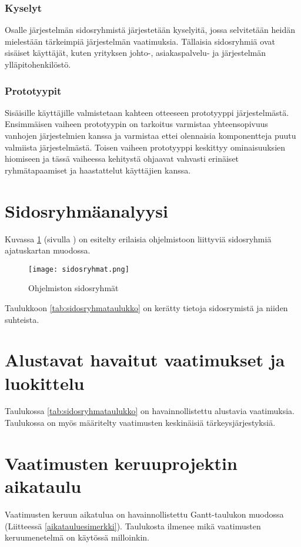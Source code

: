         \subsubsection{Kyselyt}

        Osalle järjestelmän sidosryhmistä järjestetään kyselyitä, jossa selvitetään heidän mielestään tärkeimpiä järjestelmän vaatimuksia.
        Tällaisia sidosryhmiä ovat sisäiset käyttäjät, kuten yrityksen johto-, asiakaspalvelu- ja järjestelmän ylläpitohenkilöstö.

        \subsubsection*{Prototyypit}

        Sisäisille käyttäjille valmistetaan kahteen otteeseen prototyyppi järjestelmästä. Ensimmäisen vaiheen prototyypin on tarkoitus varmistaa yhteensopivuus vanhojen järjestelmien kanssa ja varmistaa ettei olennaisia komponentteja puutu valmiista järjestelmästä. Toisen vaiheen prototyyppi keskittyy ominaisuuksien hiomiseen ja tässä vaiheessa kehitystä ohjaavat vahvasti erinäiset ryhmätapaamiset ja haastattelut käyttäjien kanssa.
	
\section{Sidosryhmäanalyysi}

        Kuvassa \ref{img:sidosryhmat} (sivulla \pageref{img:sidosryhmat}) on esitelty erilaisia ohjelmistoon liittyviä sidosryhmiä ajatuskartan muodossa.

        \begin{figure}[H] %
		\centering
		\texttt{[image: sidosryhmat.png]}
		\caption{Ohjelmiston sidosryhmät} %
		\label{img:sidosryhmat}
	\end{figure}

	Taulukkoon \ref{tab:sidosryhmataulukko} on kerätty tietoja sidosrymistä ja niiden suhteista.

\section{Alustavat havaitut vaatimukset ja luokittelu}
Taulukossa \ref{tab:sidosryhmataulukko} on havainnollistettu alustavia vaatimuksia. Taulukossa on myös määritelty vaatimusten keskinäisiä tärkeysjärjestyksiä.

    
\section{Vaatimusten keruuprojektin aikataulu}

	Vaatimusten keruun aikatulua on havainnollistettu Gantt-taulukon muodossa (Liitteessä \ref{aikatauluesimerkki}). Taulukosta ilmenee mikä vaatimusten keruumenetelmä on käytössä milloinkin.

